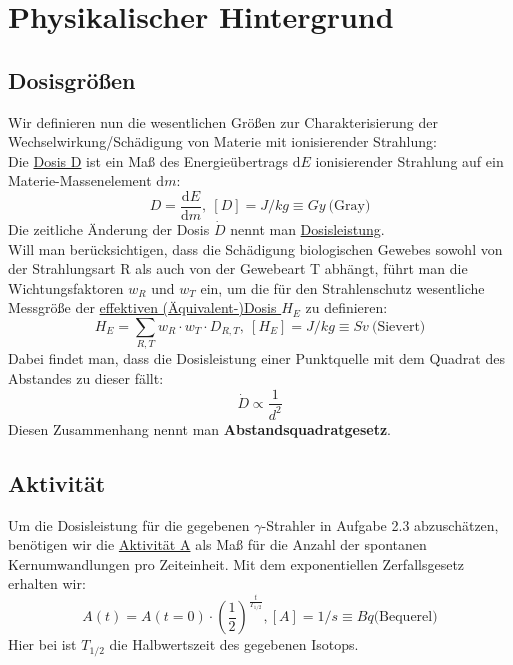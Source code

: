 \section{Physikalischer Hintergrund}
\subsection{Dosisgrößen}
Wir definieren nun die wesentlichen Größen zur Charakterisierung der Wechselwirkung/Schädigung von Materie mit ionisierender Strahlung:\\
Die \underline{Dosis D} ist ein Maß des Energieübertrags $\mathrm{d}E$ ionisierender Strahlung auf ein Materie-Massenelement $\mathrm{d}m$:
\begin{equation}\label{eq:dosis}
	D = \frac{\mathrm{d}E}{\mathrm{d}m},\ [D] = J/kg \equiv Gy\ \textrm{(Gray)}
\end{equation}
Die zeitliche Änderung der Dosis $\dot{D}$ nennt man \underline{Dosisleistung}.\\
Will man berücksichtigen, dass die Schädigung biologischen Gewebes sowohl von der Strahlungsart R als auch von der Gewebeart T abhängt, führt man die Wichtungsfaktoren $w_R$ und $w_T$ ein, um die für den Strahlenschutz wesentliche Messgröße der \underline{effektiven (Äquivalent-)Dosis $H_E$} zu definieren:
\begin{equation}
	H_E = \sum_{R,T} w_R \cdot w_T \cdot D_{R,T},\ [H_E]=J/kg \equiv Sv\ \textrm{(Sievert)}
\end{equation}
Dabei findet man, dass die Dosisleistung einer Punktquelle mit dem Quadrat des Abstandes zu dieser fällt:
\begin{equation*}
		\dot{D} \propto \frac{1}{d^2}
\end{equation*}
Diesen Zusammenhang nennt man \textbf{Abstandsquadratgesetz}.\cite{PA_neu}

\subsection{Aktivität}
Um die Dosisleistung für die gegebenen $\gamma$-Strahler in Aufgabe 2.3 abzuschätzen, benötigen wir die \underline{Aktivität A} als Maß für die Anzahl der spontanen Kernumwandlungen pro Zeiteinheit. Mit dem exponentiellen Zerfallsgesetz erhalten wir:
\begin{equation} \label{eq:aktivitaet}
	A(t)=A(t=0) \cdot \left(\frac{1}{2}\right)^{\frac{t}{T_{1/2}}}, [A] = 1/s \equiv Bq \textrm{(Bequerel)}
\end{equation}
Hier bei ist $T_{1/2}$ die Halbwertszeit des gegebenen Isotops.\cite{PA_RM1}

